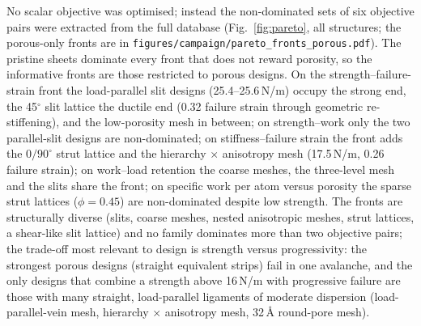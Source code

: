 No scalar objective was optimised; instead the non-dominated sets of six objective pairs were extracted from the full database (Fig.~\ref{fig:pareto}, all structures; the porous-only fronts are in \texttt{figures/\allowbreak campaign/\allowbreak pareto\_fronts\_porous.pdf}). The pristine sheets dominate every front that does not reward porosity, so the informative fronts are those restricted to porous designs. On the strength--failure-strain front the load-parallel slit designs (25.4--25.6\,N/m) occupy the strong end, the 45$^\circ$ slit lattice the ductile end (0.32 failure strain through geometric re-stiffening), and the low-porosity mesh in between; on strength--work only the two parallel-slit designs are non-dominated; on stiffness--failure strain the front adds the $0/90^\circ$ strut lattice and the hierarchy $\times$ anisotropy mesh (17.5\,N/m, 0.26 failure strain); on work--load retention the coarse meshes, the three-level mesh and the slits share the front; on specific work per atom versus porosity the sparse strut lattices ($\phi=0.45$) are non-dominated despite low strength. The fronts are structurally diverse (slits, coarse meshes, nested anisotropic meshes, strut lattices, a shear-like slit lattice) and no family dominates more than two objective pairs; the trade-off most relevant to design is strength versus progressivity: the strongest porous designs (straight equivalent strips) fail in one avalanche, and the only designs that combine a strength above 16\,N/m with progressive failure are those with many straight, load-parallel ligaments of moderate dispersion (load-parallel-vein mesh, hierarchy $\times$ anisotropy mesh, 32\,\AA{} round-pore mesh).
